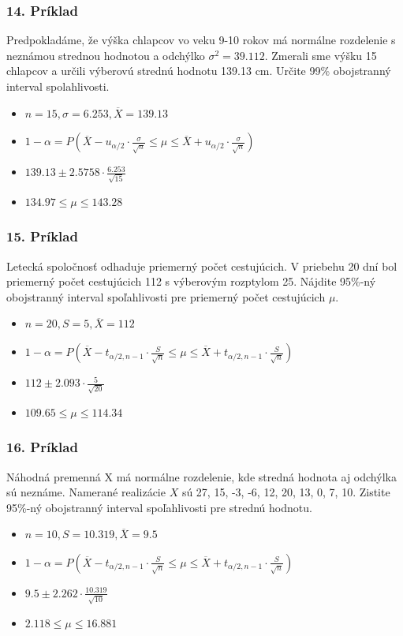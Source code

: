 \documentclass{beamer}
\begin{document}
\begin{frame}
\frametitle{14. Príklad}

Predpokladáme, že výška chlapcov vo veku 9-10 rokov má normálne rozdelenie s neznámou strednou hodnotou a odchýlko $\sigma^2 = 39.112$. Zmerali sme výšku 15 chlapcov a určili výberovú strednú hodnotu 139.13 cm. Určite 99\% obojstranný interval spolahlivosti.

\begin{itemize}
\item<2-> $n = 15, \sigma  = 6.253, \overline{X} = 139.13$
\item<3-> $1 - \alpha = P(\overline{X} - u_{\alpha/2} \cdot \frac{\sigma}{\sqrt{n}} \leq \mu \leq \overline{X} + u_{\alpha/2} \cdot \frac{\sigma}{\sqrt{n}})$
\item<4-> $139.13 \pm 2.5758 \cdot \frac{6.253}{\sqrt{15}}$
\item<5-> $134.97 \leq \mu \leq 143.28$
\end{itemize}
\end{frame}


\begin{frame}
\frametitle{15. Príklad}
Letecká spoločnosť odhaduje priemerný počet cestujúcich. V priebehu 20 dní bol priemerný počet cestujúcich 112 s výberovým rozptylom 25. Nájdite 95\%-ný obojstranný interval spoľahlivosti pre priemerný počet cestujúcich $\mu$.

\begin{itemize}
\item<2-> $n = 20, S  = 5, \overline{X} = 112$
\item<3-> $1 - \alpha = P(\overline{X} - t_{\alpha/2, n-1} \cdot \frac{S}{\sqrt{n}} \leq \mu \leq \overline{X} + t_{\alpha/2, n-1} \cdot \frac{S}{\sqrt{n}})$
\item<4-> $112 \pm 2.093 \cdot \frac{5}{\sqrt{20}}$
\item<5-> $109.65 \leq \mu \leq 114.34$
\end{itemize}
\end{frame}


\begin{frame}
\frametitle{16. Príklad}
Náhodná premenná X má normálne rozdelenie, kde stredná hodnota aj odchýlka sú neznáme. Namerané realizácie $X$ sú 27, 15, -3, -6, 12, 20, 13, 0, 7, 10. Zistite 95\%-ný obojstranný interval spoľahlivosti pre strednú hodnotu.

\begin{itemize}
\item<2-> $n = 10, S  = 10.319, \overline{X} = 9.5$
\item<3-> $1 - \alpha = P(\overline{X} - t_{\alpha/2, n-1} \cdot \frac{S}{\sqrt{n}} \leq \mu \leq \overline{X} + t_{\alpha/2, n-1} \cdot \frac{S}{\sqrt{n}})$
\item<4-> $9.5 \pm 2.262 \cdot \frac{10.319}{\sqrt{10}}$
\item<5-> $2.118 \leq \mu \leq 16.881$
\end{itemize}
\end{frame}
\end{document}

